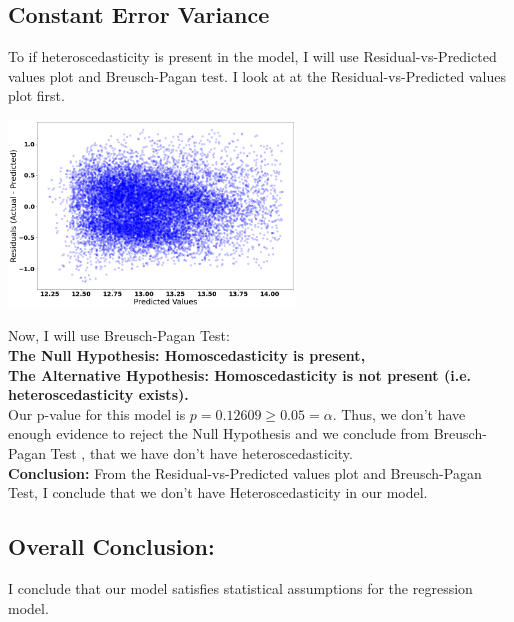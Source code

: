 \documentclass[10pt]{article}
\begin{document}
\subsection*{Constant Error Variance}
To if heteroscedasticity is present in the model, I will use Residual-vs-Predicted values plot and Breusch-Pagan test.
I look at at the Residual-vs-Predicted values plot first.
\begin{center}
	\includegraphics[width=3in]{residual_plot_linear_model}
\end{center}
Now, I will use Breusch-Pagan Test:\\
\textbf{The Null Hypothesis:  Homoscedasticity is present,\\
	The Alternative Hypothesis:  Homoscedasticity is not present (i.e. heteroscedasticity exists).}\\
Our p-value for this model is \(p=0.12609 \ge 0.05 = \alpha\). Thus, we don't have enough evidence to reject the Null Hypothesis and we conclude from Breusch-Pagan Test  , that we have don't have heteroscedasticity.\\
\textbf{Conclusion:} From the Residual-vs-Predicted values plot and  Breusch-Pagan Test, I conclude that we don't have Heteroscedasticity in our model.
\subsection*{Overall Conclusion:} I conclude that our model satisfies statistical assumptions for the regression model.
\end{document}
